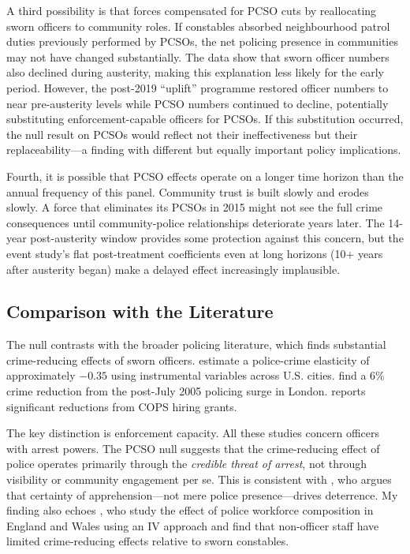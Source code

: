 \documentclass[12pt]{article}
\begin{document}
A third possibility is that forces compensated for PCSO cuts by reallocating sworn officers to community roles. If constables absorbed neighbourhood patrol duties previously performed by PCSOs, the net policing presence in communities may not have changed substantially. The data show that sworn officer numbers also declined during austerity, making this explanation less likely for the early period. However, the post-2019 ``uplift'' programme restored officer numbers to near pre-austerity levels while PCSO numbers continued to decline, potentially substituting enforcement-capable officers for PCSOs. If this substitution occurred, the null result on PCSOs would reflect not their ineffectiveness but their replaceability---a finding with different but equally important policy implications.

Fourth, it is possible that PCSO effects operate on a longer time horizon than the annual frequency of this panel. Community trust is built slowly and erodes slowly. A force that eliminates its PCSOs in 2015 might not see the full crime consequences until community-police relationships deteriorate years later. The 14-year post-austerity window provides some protection against this concern, but the event study's flat post-treatment coefficients even at long horizons (10+ years after austerity began) make a delayed effect increasingly implausible.

\subsection{Comparison with the Literature}

The null contrasts with the broader policing literature, which finds substantial crime-reducing effects of sworn officers. \citet{chalfin2018certainty} estimate a police-crime elasticity of approximately $-0.35$ using instrumental variables across U.S. cities. \citet{draca2011panic} find a 6\% crime reduction from the post-July 2005 policing surge in London. \citet{mello2019more} reports significant reductions from COPS hiring grants.

The key distinction is enforcement capacity. All these studies concern officers with arrest powers. The PCSO null suggests that the crime-reducing effect of police operates primarily through the \textit{credible threat of arrest}, not through visibility or community engagement per se. This is consistent with \citet{nagin2013deterrence}, who argues that certainty of apprehension---not mere police presence---drives deterrence. My finding also echoes \citet{bell2016police}, who study the effect of police workforce composition in England and Wales using an IV approach and find that non-officer staff have limited crime-reducing effects relative to sworn constables.
\end{document}
